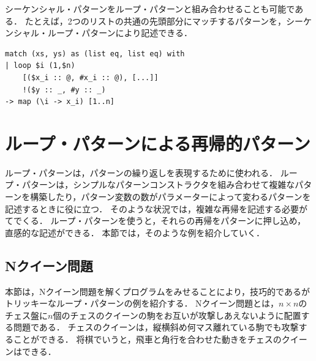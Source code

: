 シーケンシャル・パターンをループ・パターンと組み合わせることも可能である．
たとえば，2つのリストの共通の先頭部分にマッチするパターンを，シーケンシャル・ループ・パターンにより記述できる．
\begin{lstlisting}[language=egison,numbers=none]
match (xs, ys) as (list eq, list eq) with
| loop $i (1,$n)
    [($x_i :: @, #x_i :: @), [...]]
    !($y :: _, #y :: _)
-> map (\i -> x_i) [1..n]
\end{lstlisting}

\section{ループ・パターンによる再帰的パターン}\label{pmo-loop}

ループ・パターンは，パターンの繰り返しを表現するために使われる．
ループ・パターンは，シンプルなパターンコンストラクタを組み合わせて複雑なパターンを構築したり，パターン変数の数がパラメーターによって変わるパターンを記述するときに役に立つ．
そのような状況では，複雑な再帰を記述する必要がてでくる．
ループ・パターンを使うと，それらの再帰をパターンに押し込め，直感的な記述ができる．
本節では，そのような例を紹介していく．

\subsection{Nクイーン問題}\label{pmo-loop-nqueen}

本節は，Nクイーン問題を解くプログラムをみせることにより，技巧的であるがトリッキーなループ・パターンの例を紹介する．
Nクイーン問題とは，$n \times n$のチェス盤に$n$個のチェスのクイーンの駒をお互いが攻撃しあえないように配置する問題である．
チェスのクイーンは，縦横斜め何マス離れている駒でも攻撃することができる．
将棋でいうと，飛車と角行を合わせた動きをチェスのクイーンはできる．

